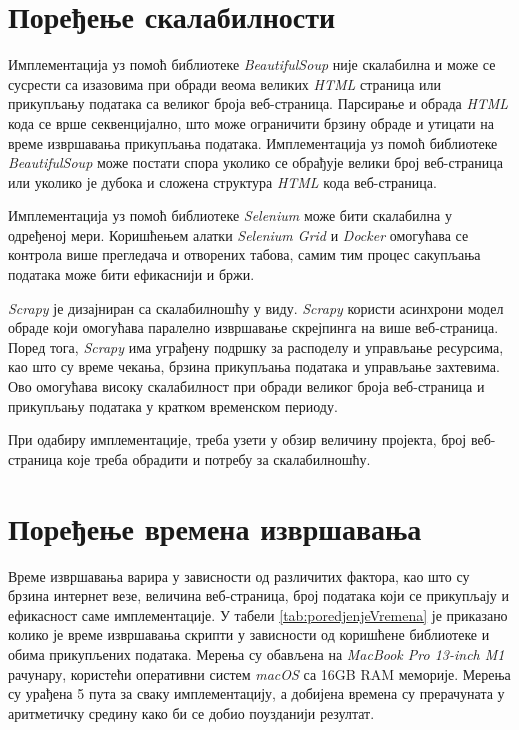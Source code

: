 \documentclass[12pt,oneside]{memoir}
\begin{document}
\section{Поређење скалабилности}
Имплементација уз помоћ библиотеке \textit{BeautifulSoup} није скалабилна и може се сусрести са изазовима при обради веома великих \textit{HTML} страница или прикупљању података са великог броја веб-страница. Парсирање и обрада \textit{HTML} кода се врше секвенцијално, што може ограничити брзину обраде и утицати на време извршавања прикупљања података. Имплементација уз помоћ библиотеке 
\textit{BeautifulSoup} може постати спора уколико се обрађује велики број веб-страница или уколико је дубока и сложена структура \textit{HTML} кода веб-страница.

Имплементација уз помоћ библиотеке \textit{Selenium} може бити скалабилна у одређеној мери. Коришћењем алатки \textit{Selenium Grid} \cite{selenium} и \textit{Docker} \cite{docker} омогућава се контрола више прегледача и отворених табова, самим тим процес сакупљања података може бити ефикаснији и бржи.

\textit{Scrapy} је дизајниран са скалабилношћу у виду.
\textit{Scrapy} користи асинхрони модел обраде који омогућава паралелно извршавање скрејпинга на више веб-страница. Поред тога, \textit{Scrapy} има уграђену подршку за расподелу и управљање ресурсима, као што су време чекања, брзина прикупљања података и управљање захтевима. Ово омогућава високу скалабилност при обради великог броја веб-страница и прикупљању података у кратком временском периоду.

При одабиру имплементације, треба узети у обзир
величину пројекта, број веб-страница које треба обрадити и потребу за скалабилношћу.

\section{Поређење времена извршавања}
Време извршавања варира у зависности од различитих фактора, као што су брзина интернет везе, величина веб-страница, број података који се прикупљају и ефикасност саме имплементације. У табели \ref{tab:poredjenjeVremena} је приказано колико је време извршавања скрипти у зависности од коришћене библиотеке и обима прикупљених података. Мерења су обављена на \textit{MacBook Pro 13-inch M1} рачунару, користећи оперативни систем \textit{macOS} са 16GB RAM меморије. Мерења су урађена 5 пута за сваку имплементацију, а добијена времена су прерачуната у аритметичку средину како би се добио поузданији резултат.
\end{document}
